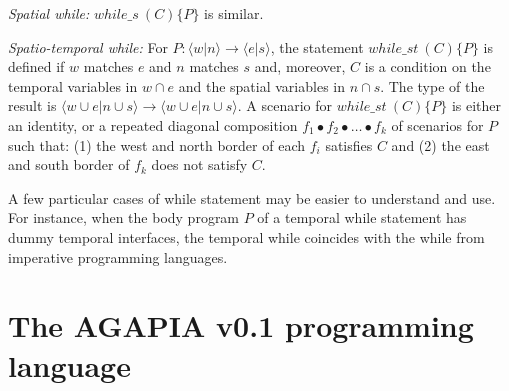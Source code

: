\documentclass[runningheads]{llncs}
\newcommand{\1}{\u{a}}
\newcommand{\2}{\c{s}}
\newcommand{\5}{\c{t}}
\newcommand{\8}{\^{\i}}
\newcommand{\9}{\^{a}}
\newcommand{\ra}{\rightarrow}
\newcommand{\dcomp}{\bullet}\newcommand{\dstar}{^\bullet}
\newcommand{\tsrv}[4]{\langle #1|#2\rangle\ra\langle #3|#4\rangle}
\begin{document}
{\em Spatial while:} $while\_s\ (C)\{P\}$ is similar.

{\em Spatio-temporal while:} For $P:\tsrv{w}{n}{e}{s}$, the statement $while\_st\ (C)\{P\}$ is defined if $w$
matches $e$ and $n$ matches $s$ and, moreover, $C$ is a condition on the temporal variables in $w\cap e$ and
the spatial variables in $n\cap s$. The type of the result is $\tsrv{w\cup e}{n\cup s}{w\cup e}{n\cup s}$. A
scenario for $while\_st\ (C)\{P\}$ is either an identity, or a repeated diagonal composition $f_1\dcomp
f_2\dcomp\dots\dcomp f_k$ of scenarios for $P$ such that: (1) the west and north border of each $f_i$
satisfies $C$ and (2) the east and south border of $f_k$ does not satisfy $C$.

A few particular cases of while statement may be easier to understand and use. For instance, when the body
program $P$ of a temporal while statement has dummy temporal interfaces, the temporal while coincides with the
while from imperative programming languages.

\section{The AGAPIA v0.1 programming language}\label{s-agap}
\end{document}

